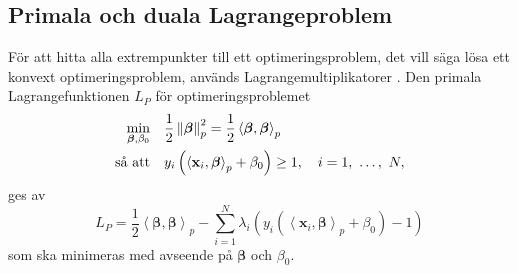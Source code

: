 \documentclass[a4paper, 12pt]{report}
\theoremstyle{definition}
\theoremstyle{remark}
\newcommand{\bfbeta}{{\boldsymbol{\beta}}}
\newcommand{\bfx}{\mathbf{x}}
\newcommand{\llangle}{\left\langle}
\newcommand{\rrangle}{\right\rangle}
\newcommand{\inner}[2]{\llangle #1, #2 \rrangle}
\begin{document}
\subsection{Primala och duala Lagrangeproblem}

För att hitta alla extrempunkter till ett optimeringsproblem, det vill säga lösa ett konvext optimeringsproblem, används Lagrangemultiplikatorer \cite{Boyd}. %
Den primala Lagrangefunktionen $L_P$ för optimeringsproblemet
\begin{equation*}
\begin{aligned}
\operatornamewithlimits{min}_{\bfbeta, \beta_0} & & &\frac{1}{2}\left\|\bfbeta
\right\|_p^2=\frac{1}{2}\inner{\bfbeta}{\bfbeta}_p\\
\text{så att} & & &y_i\left(\inner{\bfx_i}{\bfbeta}_p+\beta_0\right)\geq 1,\quad i=1,~\dots,~N,
\end{aligned}
\end{equation*}
ges av
\begin{equation}\label{eq:primallagrange}
L_P=\frac{1}{2}\inner{\bfbeta}{\bfbeta}_p - \sum_{i=1}^{N} \lambda_i\left(y_i \left(\inner{\bfx_i}{\bfbeta}_p + \beta_0\right)-1\right)
\end{equation}
som ska minimeras med avseende på $\bfbeta$ och $\beta_0$. %
\end{document}
